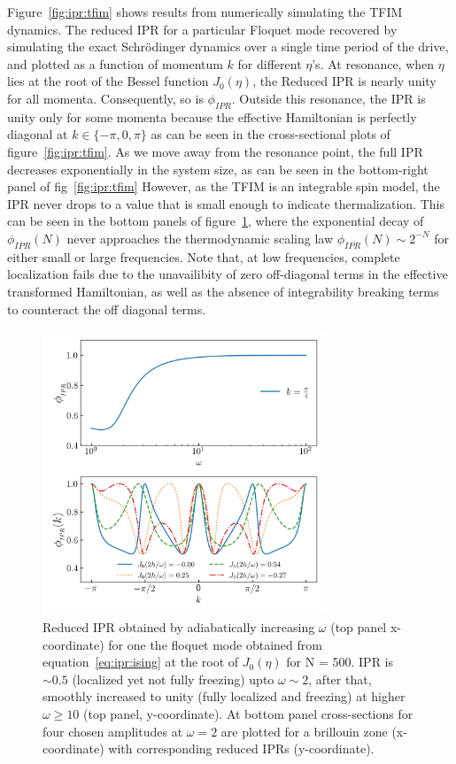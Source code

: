 \documentclass[%
reprint,
superscriptaddress,
amsmath,amssymb,
aps,
prb,
showkeys,
]{revtex4-2}
\begin{document}
Figure~\ref{fig:ipr:tfim} shows results from numerically simulating the TFIM dynamics. The reduced IPR for a particular Floquet mode recovered by simulating the exact Schr\"odinger dynamics over a single time period of the drive, and plotted as a function of momentum $k$ for different $\eta$'s. At resonance, when $\eta$ lies at the root of the Bessel function $J_0(\eta)$,  the {Reduced} IPR is {nearly} unity for all momenta. {Consequently, so is} $\phi_{IPR}$.  Outside this resonance, the IPR is unity only for some momenta because the effective Hamiltonian is perfectly diagonal at $k \in{\{-\pi, 0, \pi\}}$ as can be seen in the cross-sectional plots of figure~\ref{fig:ipr:tfim}. {As we move away from the resonance point,
the full IPR decreases {exponentially} in the system size, as can be seen in {the bottom-right panel of fig}~\ref{fig:ipr:tfim}}
However, as the TFIM is an integrable spin model, the IPR never drops to a value that is small enough to indicate thermalization. {This can be seen in the bottom panels of figure}~\ref{fig:ipr:isinglowfrk}{, where the exponential decay of} $\phi_{IPR}(N)$ {never approaches the thermodynamic scaling law $\phi_{IPR}(N)\sim 2^{-N}$ for either small or large frequencies. Note that, a}t low frequencies, {complete localization} fails due to the unavailibity of zero off-diagonal terms in the  effective transformed Hamiltonian, as well as the absence of integrability breaking terms to counteract the off diagonal terms. 
\begin{figure}[t!]
	\centering
	\includegraphics[width = 8.5cm]{ising_exact_lowfr_ipr.jpeg}
	\caption{Reduced IPR obtained by adiabatically increasing $\omega$ (top panel x-coordinate) for one the floquet mode obtained from equation~\ref{eq:ipr:ising} at the root of $J_0(\eta)$ for N = 500. IPR is $\sim 0.5$ (localized yet not fully freezing) upto $\omega \sim 2$, after that, smoothly increased to unity (fully localized and freezing) at higher $\omega \geq 10$ (top panel, y-coordinate). At bottom panel cross-sections for four chosen amplitudes at $\omega =2$ are plotted for a brillouin zone (x-coordinate) with corresponding reduced IPRs (y-coordinate).}
	\label{fig:ipr:isinglowfrk}
\end{figure}
\end{document}
